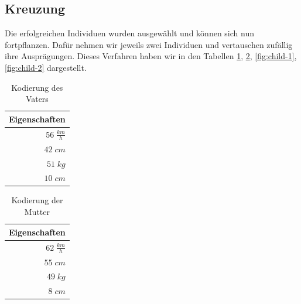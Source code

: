        \subsection{Kreuzung}
            Die erfolgreichen Individuen wurden ausgewählt und können sich nun fortpflanzen. Dafür nehmen wir jeweils zwei Individuen und vertauschen zufällig ihre Ausprägungen. Dieses Verfahren haben wir in den Tabellen \ref{fig:enc-dad}, \ref{fig:enc-mom}, \ref{fig:child-1}, \ref{fig:child-2} dargestellt.
            \\[8mm]
            \begin{multicols}{2}
                \begin{table}[H]
                    \begin{center}
                    \begin{tabular}{ |r| } 
                        \hline
                        \hfill Eigenschaften  \\ \hline
                        \cellcolor{blue!25} $ 56\; \frac{km}{h}$ \\ \hline
                        \cellcolor{blue!25} $ 42\; cm          $ \\ \hline
                        \cellcolor{blue!25} $ 51\; kg          $ \\ \hline
                        \cellcolor{blue!25} $ 10\; cm          $ \\ \hline
                    \end{tabular}
                    \end{center}
                    \caption{Kodierung des Vaters \label{fig:enc-dad}}
                \end{table}

                \begin{table}[H]
                    \begin{center}
                    \begin{tabular}{ |r| } 
                        \hline
                        \hfill Eigenschaften  \\ \hline
                        \cellcolor{yellow!25} $ 62\; \frac{km}{h}$ \\ \hline
                        \cellcolor{yellow!25} $ 55\; cm          $ \\ \hline
                        \cellcolor{yellow!25} $ 49\; kg          $ \\ \hline
                        \cellcolor{yellow!25} $  8\; cm          $ \\ \hline
                    \end{tabular}
                    \end{center}
                    \caption{Kodierung der Mutter \label{fig:enc-mom}}
                \end{table}

            \end{multicols}

